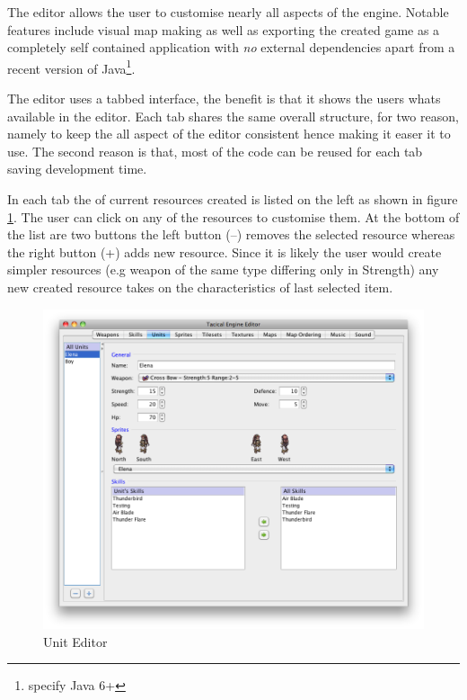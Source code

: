 The editor allows the user to customise nearly all aspects of the engine.  Notable features include visual map making as well as exporting the created game as a completely self contained application with \emph{no} external dependencies apart from a recent version of Java\footnote{specify Java 6+}. 

The editor uses a tabbed interface, the benefit is that it shows the users whats available in the editor. Each tab shares the same overall structure, for two reason, namely to keep the all aspect of the editor consistent hence making it easer it to use. The second reason is that, most of the code can be reused for each tab saving development time. 

In each tab the of current resources created is listed on the left as shown in figure \ref{fig:figures_editor_Units}. The user can click on any of the resources to customise them. At the bottom of the list are two buttons the left button (--) removes the selected resource whereas the right button (+) adds new resource. Since it is likely the user would create simpler resources (e.g  weapon of the same type differing only in Strength) any new created resource takes on the characteristics of last selected item.

\begin{figure}[htbp]
	\centering
		\includegraphics[width=\textwidth]{figures/editor/Units.png}
	\caption{Unit Editor}
	\label{fig:figures_editor_Units}
\end{figure}

